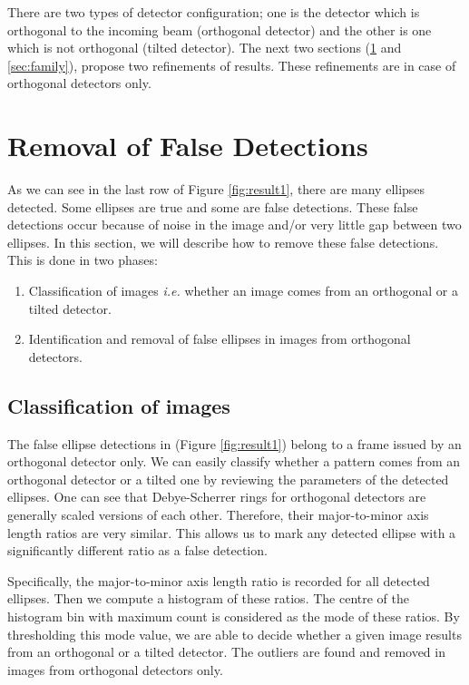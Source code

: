 \documentclass[preprint]{iucr}              %
\newcommand\dsrs{Debye-Scherrer rings}
\begin{document}
There are two types of detector configuration; one is the detector which is orthogonal to the incoming beam (orthogonal detector) and the other is one which is not orthogonal (tilted detector). The next two sections (\ref{sec:removalFD} and \ref{sec:family}), propose two refinements of results. These refinements are in case of orthogonal detectors only.

\section{Removal of False Detections}
\label{sec:removalFD}
As we can see in the last row of Figure \ref{fig:result1}, there are many ellipses detected. Some ellipses are true and some are false detections. These false detections occur because of noise in the image and/or very little gap between two ellipses. In this section, we will describe how to remove these false detections. This is done in two phases:
\begin{enumerate}
    \item Classification of images \emph{i.e.} whether an image comes from an orthogonal or a tilted detector.
    \item Identification and removal of false ellipses in images from orthogonal detectors.
\end{enumerate}

\subsection{Classification of images}
The false ellipse detections in  (Figure \ref{fig:result1}) belong to a frame issued by an orthogonal detector only. We can easily classify whether a pattern comes from an orthogonal detector or a tilted one by reviewing the parameters of the detected ellipses. One can see that \dsrs{} for orthogonal detectors are generally scaled versions of each other. Therefore, their major-to-minor axis length ratios are very similar. This allows us to mark any detected ellipse with a significantly different ratio as a false detection. 

Specifically, the major-to-minor axis length ratio is recorded for all detected ellipses. Then we compute a histogram of these ratios. The centre of the histogram bin with maximum count is considered as the mode of these ratios. By thresholding this mode value, we are able to decide whether a given image results from an orthogonal or a tilted detector. The outliers are found and removed in images from orthogonal detectors only.
\end{document}
